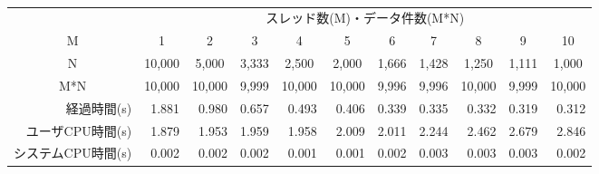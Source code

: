\documentclass{standalone}
\begin{document}
\tt\footnotesize
\begin{tabular}{r | r r r r r r r r r r}
\multicolumn{1}{c}{}&\multicolumn{10}{c}{スレッド数(M)・データ件数(M*N)}\\
\multicolumn{1}{c|}{M}&\multicolumn{1}{c}{1}&\multicolumn{1}{c}{2}&
\multicolumn{1}{c}{3}&\multicolumn{1}{c}{4}&\multicolumn{1}{c}{5}&
\multicolumn{1}{c}{6}&\multicolumn{1}{c}{7}&\multicolumn{1}{c}{8}&
\multicolumn{1}{c}{9}&\multicolumn{1}{c}{10}\\
\multicolumn{1}{c|}{N}&\multicolumn{1}{c}{10,000}&\multicolumn{1}{c}{5,000}&
\multicolumn{1}{c}{3,333}&\multicolumn{1}{c}{2,500}&\multicolumn{1}{c}{2,000}&
\multicolumn{1}{c}{1,666}&\multicolumn{1}{c}{1,428}&\multicolumn{1}{c}{1,250}&
\multicolumn{1}{c}{1,111}&\multicolumn{1}{c}{1,000}\\
\multicolumn{1}{c|}{M*N}&\multicolumn{1}{c}{10,000}&\multicolumn{1}{c}{10,000}&
\multicolumn{1}{c}{9,999}&\multicolumn{1}{c}{10,000}&
\multicolumn{1}{c}{10,000}&\multicolumn{1}{c}{9,996}&
\multicolumn{1}{c}{9,996}&\multicolumn{1}{c}{10,000}&
\multicolumn{1}{c}{9,999}&\multicolumn{1}{c}{10,000}\\
\hline
経過時間(s)        & 1.881 & 0.980 & 0.657 & 0.493 & 0.406 
                   & 0.339 & 0.335 & 0.332 & 0.319 & 0.312 \\
ユーザCPU時間(s)   & 1.879 & 1.953 & 1.959 & 1.958 & 2.009
                   & 2.011 & 2.244 & 2.462 & 2.679 & 2.846 \\
システムCPU時間(s) & 0.002 & 0.002 & 0.002 & 0.001 & 0.001
                   & 0.002 & 0.003 & 0.003 & 0.003 & 0.002 \\
\end{tabular}
\end{document}
